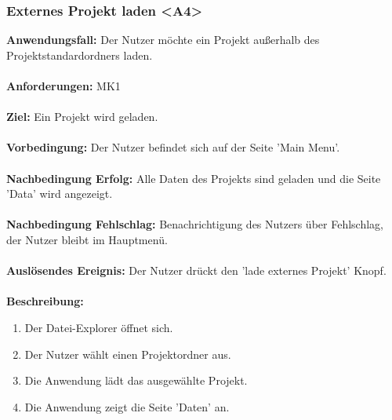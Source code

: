\documentclass[parskip=full]{scrartcl} %
\begin{document}
\subsubsection*{Externes Projekt laden <A4>}
\textbf{Anwendungsfall:} Der Nutzer möchte ein Projekt außerhalb des Projektstandardordners laden.\\\\
\textbf{Anforderungen:} MK1\\\\
\textbf{Ziel:} Ein Projekt wird geladen. \\\\
\textbf{Vorbedingung:} Der Nutzer befindet sich auf der Seite 'Main Menu'.  \\\\
\textbf{Nachbedingung Erfolg:} Alle Daten des Projekts sind geladen und die Seite 'Data' wird angezeigt. \\\\
\textbf{Nachbedingung Fehlschlag:} Benachrichtigung des Nutzers über Fehlschlag, der Nutzer bleibt im Hauptmenü. \\\\
\textbf{Auslösendes Ereignis:}  Der Nutzer drückt den 'lade externes Projekt' Knopf. \\\\
\textbf{Beschreibung:}
\begin{enumerate}
    \item Der Datei-Explorer öffnet sich.
    \item Der Nutzer wählt einen Projektordner aus.
    \item Die Anwendung lädt das ausgewählte Projekt.
    \item Die Anwendung zeigt die Seite 'Daten' an.
\end{enumerate}
\newpage
\end{document}
